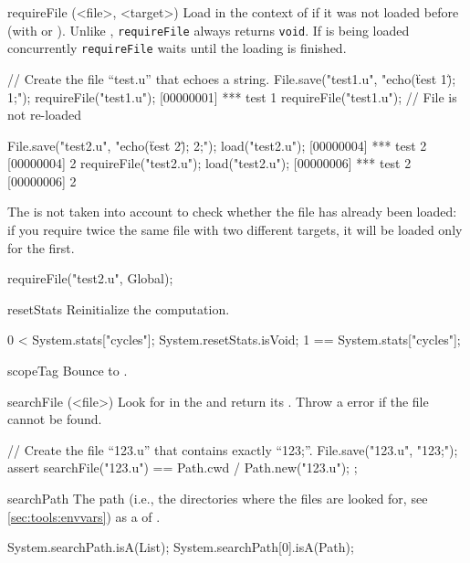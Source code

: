 \begin{urbiscriptapi}
\item[requireFile](<file>, <target>)%
  Load  in the context of  if it was not loaded before
  (with  or ). Unlike ,
  \lstinline{requireFile} always returns \lstinline|void|. If  is
  being loaded concurrently \lstinline{requireFile} waits until the loading
  is finished.

\begin{urbiscript}
// Create the file ``test.u'' that echoes a string.
File.save("test1.u", "echo(\"test 1\"); 1;");
requireFile("test1.u");
[00000001] *** test 1
requireFile("test1.u");
// File is not re-loaded

File.save("test2.u", "echo(\"test 2\"); 2;");
load("test2.u");
[00000004] *** test 2
[00000004] 2
requireFile("test2.u");
load("test2.u");
[00000006] *** test 2
[00000006] 2
\end{urbiscript}

  The  is not taken into account to check whether the file has
  already been loaded: if you require twice the same file with two different
  targets, it will be loaded only for the first.

\begin{urbiscript}
requireFile("test2.u", Global);
\end{urbiscript}

\item[resetStats]%
  Reinitialize the  computation.
\begin{urbiassert}
 0  < System.stats["cycles"];
System.resetStats.isVoid;
 1 == System.stats["cycles"];
\end{urbiassert}


\item[scopeTag] Bounce to .


\item[searchFile](<file>)%
  Look for  in the  and return its
  .  Throw a  error if the
  file cannot be found.
\begin{urbiscript}
// Create the file ``123.u'' that contains exactly ``123;''.
File.save("123.u", "123;");
assert
{
  searchFile("123.u") == Path.cwd / Path.new("123.u");
};
\end{urbiscript}


\item[searchPath] The \urbi path (i.e., the directories where the \us files
  are looked for, see \autoref{sec:tools:envvars}) as a  of
  .
\begin{urbiassert}
System.searchPath.isA(List);
System.searchPath[0].isA(Path);
\end{urbiassert}



\end{urbiscriptapi}
